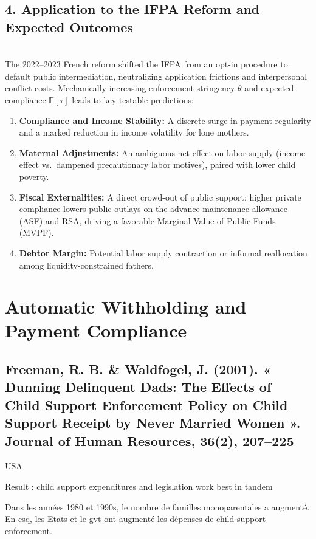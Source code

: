 \documentclass{article}
\begin{document}
\subsection{4. Application to the IFPA Reform and Expected Outcomes} \\
The 2022--2023 French reform shifted the IFPA from an opt-in procedure to default public intermediation, neutralizing application frictions and interpersonal conflict costs. Mechanically increasing enforcement stringency $\theta$ and expected compliance $\mathbb{E}[\tau]$ leads to key testable predictions:
\begin{enumerate}
    \setlength\itemsep{0.15em}
    \item \textbf{Compliance and Income Stability:} A discrete surge in payment regularity and a marked reduction in income volatility for lone mothers.
    \item \textbf{Maternal Adjustments:} An ambiguous net effect on labor supply (income effect vs.\ dampened precautionary labor motives), paired with lower child poverty.
    \item \textbf{Fiscal Externalities:} A direct crowd-out of public support: higher private compliance lowers public outlays on the advance maintenance allowance (ASF) and RSA, driving a favorable Marginal Value of Public Funds (MVPF).
    \item \textbf{Debtor Margin:} Potential labor supply contraction or informal reallocation among liquidity-constrained fathers.
\end{enumerate}

\section{Automatic Withholding and Payment Compliance}

 
\subsection*{Freeman, R. B. \& Waldfogel, J. (2001). « Dunning Delinquent Dads: The Effects of Child Support Enforcement Policy on Child Support Receipt by Never Married Women ». Journal of Human Resources, 36(2), 207--225}
 
\noindent USA
 
\noindent Result : child support expenditures and legislation work best in tandem
 
\medskip
\noindent Dans les années 1980 et 1990s, le nombre de familles monoparentales a augmenté. En csq, les Etats et le gvt ont augmenté les dépenses de child support enforcement.
 
\end{document}
